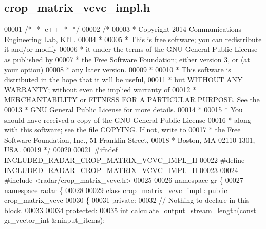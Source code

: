 \subsection{crop\+\_\+matrix\+\_\+vcvc\+\_\+impl.\+h}
\label{crop__matrix__vcvc__impl_8h_source}

\begin{DoxyCode}
00001 \textcolor{comment}{/* -*- c++ -*- */}
00002 \textcolor{comment}{/* }
00003 \textcolor{comment}{ * Copyright 2014 Communications Engineering Lab, KIT.}
00004 \textcolor{comment}{ * }
00005 \textcolor{comment}{ * This is free software; you can redistribute it and/or modify}
00006 \textcolor{comment}{ * it under the terms of the GNU General Public License as published by}
00007 \textcolor{comment}{ * the Free Software Foundation; either version 3, or (at your option)}
00008 \textcolor{comment}{ * any later version.}
00009 \textcolor{comment}{ * }
00010 \textcolor{comment}{ * This software is distributed in the hope that it will be useful,}
00011 \textcolor{comment}{ * but WITHOUT ANY WARRANTY; without even the implied warranty of}
00012 \textcolor{comment}{ * MERCHANTABILITY or FITNESS FOR A PARTICULAR PURPOSE.  See the}
00013 \textcolor{comment}{ * GNU General Public License for more details.}
00014 \textcolor{comment}{ * }
00015 \textcolor{comment}{ * You should have received a copy of the GNU General Public License}
00016 \textcolor{comment}{ * along with this software; see the file COPYING.  If not, write to}
00017 \textcolor{comment}{ * the Free Software Foundation, Inc., 51 Franklin Street,}
00018 \textcolor{comment}{ * Boston, MA 02110-1301, USA.}
00019 \textcolor{comment}{ */}
00020 
00021 \textcolor{preprocessor}{#ifndef INCLUDED\_RADAR\_CROP\_MATRIX\_VCVC\_IMPL\_H}
00022 \textcolor{preprocessor}{#define INCLUDED\_RADAR\_CROP\_MATRIX\_VCVC\_IMPL\_H}
00023 
00024 \textcolor{preprocessor}{#include <radar/crop_matrix_vcvc.h>}
00025 
00026 \textcolor{keyword}{namespace }gr \{
00027   \textcolor{keyword}{namespace }radar \{
00028 
00029     \textcolor{keyword}{class }crop_matrix_vcvc_impl : \textcolor{keyword}{public} crop_matrix_vcvc
00030     \{
00031      \textcolor{keyword}{private}:
00032       \textcolor{comment}{// Nothing to declare in this block.}
00033 
00034      \textcolor{keyword}{protected}:
00035       \textcolor{keywordtype}{int} calculate_output_stream_length(\textcolor{keyword}{const} gr\_vector\_int &ninput\_items);

\end{DoxyCode}

